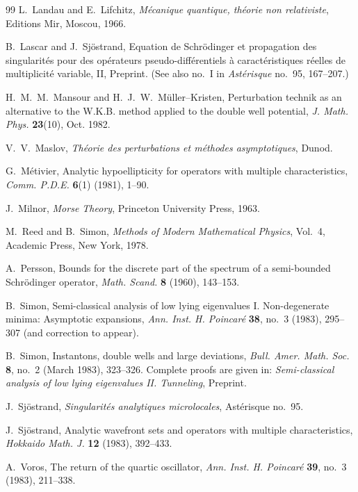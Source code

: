 \documentclass[11pt,a4paper]{article}
\numberwithin{equation}{section}
\theoremstyle{remark}
\begin{document}
\begin{thebibliography}{99}
L.~Landau and E.~Lifchitz,
\emph{M\'ecanique quantique, th\'eorie non relativiste}, Editions Mir, Moscou, 1966.

B.~Lascar and J.~Sj\"ostrand,
Equation de Schr\"odinger et propagation des singularit\'es pour des op\'erateurs pseudo-diff\'erentiels \`a caract\'eristiques r\'eelles de multiplicit\'e variable, II, Preprint.
(See also no.~I in \emph{Ast\'erisque} no.~95, 167--207.)

H.~M.~M.~Mansour and H.~J.~W.~M\"uller--Kristen,
Perturbation technik as an alternative to the W.K.B. method applied to the double well potential,
\emph{J. Math. Phys.} \textbf{23}(10), Oct. 1982.

V.~V.~Maslov,
\emph{Th\'eorie des perturbations et m\'ethodes asymptotiques}, Dunod.

G.~M\'etivier,
Analytic hypoellipticity for operators with multiple characteristics,
\emph{Comm. P.D.E.} \textbf{6}(1) (1981), 1--90.

J.~Milnor,
\emph{Morse Theory}, Princeton University Press, 1963.

M.~Reed and B.~Simon,
\emph{Methods of Modern Mathematical Physics}, Vol.~4, Academic Press, New York, 1978.

A.~Persson,
Bounds for the discrete part of the spectrum of a semi-bounded Schr\"odinger operator,
\emph{Math. Scand.} \textbf{8} (1960), 143--153.

B.~Simon,
Semi-classical analysis of low lying eigenvalues I. Non-degenerate minima: Asymptotic expansions,
\emph{Ann. Inst. H. Poincar\'e} \textbf{38}, no.~3 (1983), 295--307 (and correction to appear).

B.~Simon,
Instantons, double wells and large deviations,
\emph{Bull. Amer. Math. Soc.} \textbf{8}, no.~2 (March 1983), 323--326.
Complete proofs are given in: \emph{Semi-classical analysis of low lying eigenvalues II. Tunneling}, Preprint.

J.~Sj\"ostrand,
\emph{Singularit\'es analytiques microlocales}, Ast\'erisque no.~95.

J.~Sj\"ostrand,
Analytic wavefront sets and operators with multiple characteristics,
\emph{Hokkaido Math. J.} \textbf{12} (1983), 392--433.

A.~Voros,
The return of the quartic oscillator,
\emph{Ann. Inst. H. Poincar\'e} \textbf{39}, no.~3 (1983), 211--338.


\end{thebibliography}
\end{document}
